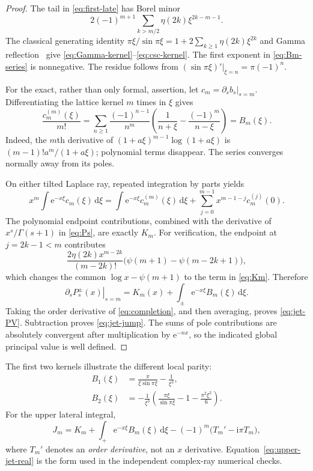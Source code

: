 \documentclass[11pt,a4paper]{article}
\theoremstyle{definition}\newtheorem{definition}[theorem]{Definition}
\theoremstyle{remark}\newtheorem{remark}[theorem]{Remark}
\newcommand{\dd}{\,\mathrm d}
\newcommand{\ii}{\mathrm i}
\newcommand{\ee}{\mathrm e}
\numberwithin{equation}{section}
\begin{document}
\begin{proof}
The tail in \eqref{eq:first-late} has Borel minor
\begin{equation}\label{eq:Bm-series}
 2(-1)^{m+1}\sum_{k>m/2}\eta(2k)\xi^{2k-m-1}.
\end{equation}
The classical generating identity
$\pi\xi/\sin\pi\xi=1+2\sum_{k\ge1}\eta(2k)\xi^{2k}$
and Gamma reflection~\cite{DLMFgamma} give
\eqref{eq:Gamma-kernel}--\eqref{eq:csc-kernel}. The first exponent in
\eqref{eq:Bm-series} is nonnegative. The residue follows from
$(\sin\pi\xi)'|_{\xi=n}=\pi(-1)^n$.

For the exact, rather than only formal, assertion, let
$c_m=\partial_s b_s|_{s=m}$. Differentiating the lattice kernel $m$ times
in $\xi$ gives
\begin{equation}\label{eq:Bm-partial}
 \frac{c_m^{(m)}(\xi)}{m!}
 =\sum_{n\ge1}\frac{(-1)^{n-1}}{n^m}
      \left(\frac1{n+\xi}-\frac{(-1)^m}{n-\xi}\right)=B_m(\xi).
\end{equation}
Indeed, the $m$th derivative of
$(1+a\xi)^{m-1}\log(1+a\xi)$ is
$(m-1)!a^m/(1+a\xi)$; polynomial terms disappear.
The series converges normally away from its poles.

On either tilted Laplace ray, repeated integration by parts yields
\[
 x^m\int\ee^{-x\xi}c_m(\xi)\dd\xi
 =\int\ee^{-x\xi}c_m^{(m)}(\xi)\dd\xi
       +\sum_{j=0}^{m-1}x^{m-1-j}c_m^{(j)}(0).
\]
The polynomial endpoint contributions, combined with the derivative of
$x^s/\Gamma(s+1)$ in \eqref{eq:Ps}, are exactly $K_m$.
For verification, the endpoint at $j=2k-1<m$ contributes
\[
 \frac{2\eta(2k)x^{m-2k}}{(m-2k)!}
       \bigl(\psi(m+1)-\psi(m-2k+1)\bigr),
\]
which changes the common $\log x-\psi(m+1)$ to the term in
\eqref{eq:Km}. Therefore
\begin{equation}\label{eq:jet-lateral}
 \left.\partial_sP_s^\pm(x)\right|_{s=m}
     =K_m(x)+\int_\pm\ee^{-x\xi}B_m(\xi)\dd\xi.
\end{equation}
Taking the order derivative of \eqref{eq:completion}, and then averaging,
proves \eqref{eq:jet-PV}. Subtraction proves \eqref{eq:jet-jump}.
The sums of pole contributions are absolutely convergent after multiplication
by $\ee^{-nx}$, so the indicated global principal value is well defined.
\end{proof}

The first two kernels illustrate the different local parity:
\begin{align}
 B_1(\xi)&=\frac{\pi}{\xi\sin\pi\xi}-\frac1{\xi^2},\label{eq:B1}\\
 B_2(\xi)&=-\frac1{\xi^3}
       \left(\frac{\pi\xi}{\sin\pi\xi}-1-\frac{\pi^2\xi^2}{6}\right).
\end{align}
For the upper lateral integral,
\begin{equation}\label{eq:upper-jet-real}
 J_m=K_m+\int_+\ee^{-x\xi}B_m(\xi)\dd\xi
           -(-1)^m\bigl(T_m'-\ii\pi T_m\bigr),
\end{equation}
where $T_m'$ denotes an \emph{order derivative}, not an $x$ derivative.
Equation~\eqref{eq:upper-jet-real} is the form used in the independent
complex-ray numerical checks.
\end{document}
